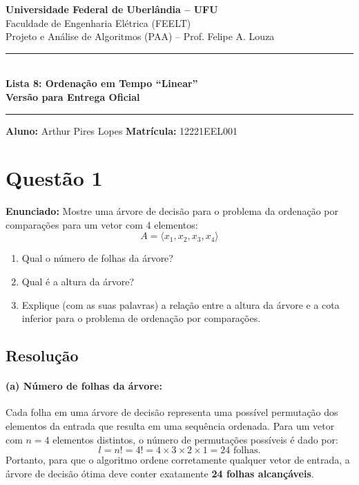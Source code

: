 \documentclass[11pt,a4paper]{article}
\begin{document}
\begin{center}
    {\Large \textbf{Universidade Federal de Uberlândia -- UFU}}\\[2pt]
    {\large Faculdade de Engenharia Elétrica (FEELT)}\\[2pt]
    {\large Projeto e Análise de Algoritmos (PAA) -- Prof. Felipe A. Louza}\\[4pt]
    \rule{\textwidth}{1pt}\\[5pt]
    {\LARGE \textbf{Lista 8: Ordenação em Tempo ``Linear''}}\\[3pt]
    \textbf{Versão para Entrega Oficial}\\[2pt]
    \rule{\textwidth}{0.5pt}
\end{center}

\vspace{0.1cm}
\noindent \textbf{Aluno:} Arthur Pires Lopes \quad \textbf{Matrícula:} 12221EEL001

\vspace{0.3cm}

\section*{Questão 1}
\textbf{Enunciado:} Mostre uma árvore de decisão para o problema da ordenação por comparações para um vetor com 4 elementos:
\[
A = \langle x_1, x_2, x_3, x_4 \rangle
\]
\begin{enumerate}
    \item[(a)] Qual o número de folhas da árvore?
    \item[(b)] Qual é a altura da árvore?
    \item[(c)] Explique (com as suas palavras) a relação entre a altura da árvore e a cota inferior para o problema de ordenação por comparações.
\end{enumerate}

\subsection*{Resolução}

\paragraph{(a) Número de folhas da árvore:}
Cada folha em uma árvore de decisão representa uma possível permutação dos elementos da entrada que resulta em uma sequência ordenada. Para um vetor com $n = 4$ elementos distintos, o número de permutações possíveis é dado por:
\begin{equation}
    l = n! = 4! = 4 \times 3 \times 2 \times 1 = 24 \text{ folhas}.
\end{equation}
Portanto, para que o algoritmo ordene corretamente qualquer vetor de entrada, a árvore de decisão ótima deve conter exatamente \textbf{24 folhas alcançáveis}.
\end{document}
